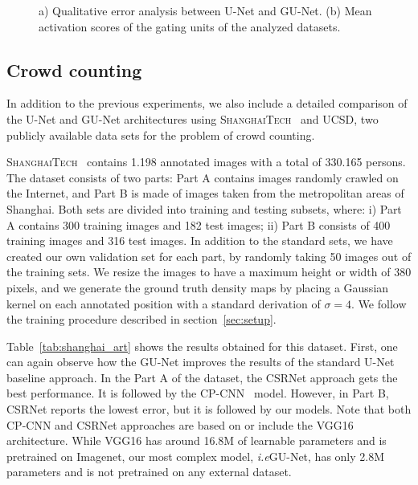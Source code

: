 \documentclass{bmvc2k}
\def\ie{\emph{i.e}\bmvaOneDot}
\begin{document}
\begin{figure}[t!]
\centering
{}\hspace{5mm}
\caption{a) Qualitative error analysis between U-Net and GU-Net. (b) Mean activation scores of the gating units of the analyzed datasets.}
\label{fig:general_diagram}
\end{figure}\subsection{Crowd counting}
In addition to the previous experiments, we also include a detailed comparison of the U-Net and GU-Net architectures using \textsc{ShanghaiTech}~\cite{zhang2016} and \textsc{UCSD}\cite{chan2008}, two publicly available data sets for the problem of crowd counting.

\textsc{ShanghaiTech}~\cite{zhang2016} contains 1.198 annotated images with a total of 330.165 persons. The dataset consists of two parts: Part A contains images randomly crawled on the Internet, and Part B is made of images taken from the metropolitan areas of Shanghai. Both sets are divided into training and testing subsets, where: i) Part A contains 300 training images and 182 test images; ii) Part B consists of 400 training images and 316 test images. In addition to the standard sets, we have created our own validation set for each part, by randomly taking 50 images out of the training sets. We resize the images to have a maximum height or width of 380 pixels, and we generate the ground truth density maps by placing a Gaussian kernel on each annotated position with a standard derivation of $\sigma = 4$. We follow the training procedure described in section~\ref{sec:setup}. 

Table~\ref{tab:shanghai_art} shows the results obtained for this dataset. First, one can again observe how the GU-Net improves the results of the standard U-Net baseline approach. In the Part A of the dataset, the CSRNet \cite{yuhong2018_csrnet} approach gets the best performance. It is followed by the CP-CNN~ \cite{Sindagi_2017_ICCV} model. However, in Part B, CSRNet reports the lowest error, but it is followed by our models. Note that both CP-CNN and CSRNet approaches are based on or include the VGG16 architecture. While VGG16 has around 16.8M of learnable parameters and is pretrained on Imagenet, our most complex model, \ie GU-Net, has only 2.8M parameters and is not pretrained on any external dataset.
\end{document}
